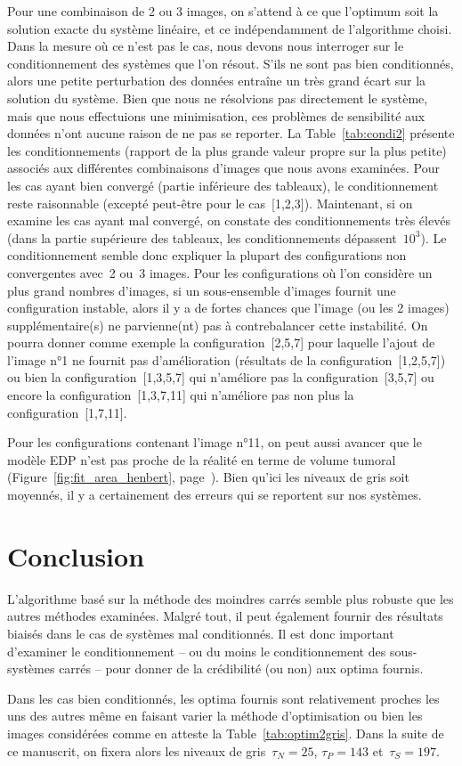 \documentclass[main.tex]{subfiles}
\begin{document}
Pour une combinaison de 2 ou 3 images, on s'attend à ce que l'optimum soit la solution exacte du système linéaire, et ce indépendamment de l'algorithme choisi. Dans la mesure où ce n'est pas le cas, nous devons nous interroger sur le conditionnement des systèmes que l'on résout. S'ils ne 
sont pas bien conditionnés, alors une petite perturbation des données entraîne un très grand écart sur la solution du système. Bien que nous ne résolvions pas directement le système, mais que nous effectuions une minimisation, ces problèmes de sensibilité aux données n'ont aucune raison de ne pas se reporter. La Table~\ref{tab:condi2} présente les conditionnements (rapport de la plus grande valeur propre sur la plus petite) associés aux différentes combinaisons d'images que nous avons examinées. 
Pour les cas ayant bien convergé (partie inférieure des tableaux), le conditionnement reste raisonnable (excepté peut-être pour le cas~[1,2,3]). 
Maintenant, si on examine les cas ayant mal convergé, on constate des conditionnements très élevés (dans la partie supérieure des tableaux, les conditionnements dépassent~$10^3$). Le conditionnement semble donc expliquer la plupart des configurations non convergentes avec~2 ou~3 images. Pour les configurations où l'on considère un plus grand nombres d'images, si un sous-ensemble d'images fournit une configuration instable, alors il y a de fortes chances que l'image (ou les 2 images) supplémentaire(s) ne parvienne(nt) pas à contrebalancer cette instabilité. On pourra donner comme  exemple la configuration~[2,5,7] pour laquelle l'ajout de l'image n°1 ne fournit pas d'amélioration (\cf résultats de la configuration~[1,2,5,7]) ou bien la configuration~[1,3,5,7] qui n'améliore pas la configuration~[3,5,7] ou encore la configuration~[1,3,7,11] qui n'améliore pas non plus la configuration~[1,7,11].


Pour les configurations contenant l'image n°11, on peut aussi avancer que le modèle EDP n'est pas proche de la réalité en terme de volume tumoral (\cf Figure~\ref{fig:fit_area_henbert}, page~\pageref{fig:fit_area_henbert}). Bien qu'ici les niveaux de gris soit moyennés, il y a certainement des erreurs qui se reportent sur nos systèmes.

\section{Conclusion}
L'algorithme basé sur la méthode des moindres carrés semble plus robuste que les autres méthodes examinées. Malgré tout, il peut également fournir des résultats biaisés dans le cas de systèmes mal conditionnés. Il est donc important d'examiner le conditionnement -- ou du moins le conditionnement des sous-systèmes carrés -- pour donner de la crédibilité (ou non) aux optima fournis.

Dans les cas bien conditionnés,  les optima fournis sont relativement proches les uns des autres même en faisant varier la méthode d'optimisation ou bien les images considérées comme en atteste la Table~\ref{tab:optim2gris}. Dans la suite de ce manuscrit, on fixera alors les niveaux de gris~$\tau_N=25$, $\tau_P=143$ et~$\tau_S=197$.
\end{document}
